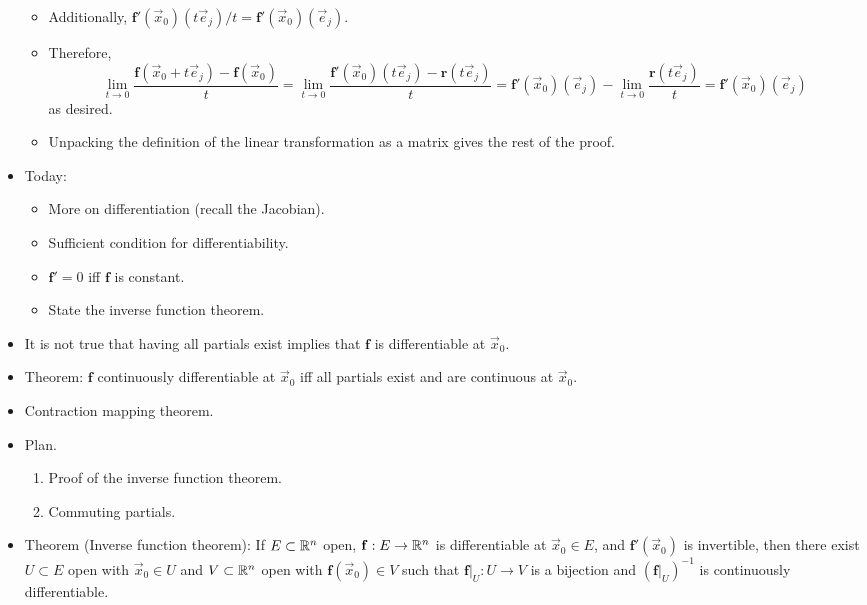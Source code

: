 \documentclass[../notes.tex]{subfiles}
\begin{document}
\begin{itemize}
\begin{itemize}
        \item Additionally, $\mathbf{f}'(\vec{x}_0)(t\vec{e}_j)/t=\mathbf{f}'(\vec{x}_0)(\vec{e}_j)$.
        \item Therefore,
        \begin{equation*}
            \lim_{t\to 0}\frac{\mathbf{f}(\vec{x}_0+t\vec{e}_j)-\mathbf{f}(\vec{x}_0)}{t}
            = \lim_{t\to 0}\frac{\mathbf{f}'(\vec{x}_0)(t\vec{e}_j)-\mathbf{r}(t\vec{e}_j)}{t}
            = \mathbf{f}'(\vec{x}_0)(\vec{e}_j)-\lim_{t\to 0}\frac{\mathbf{r}(t\vec{e}_j)}{t}
            = \mathbf{f}'(\vec{x}_0)(\vec{e}_j)
        \end{equation*}
        as desired.
        \item Unpacking the definition of the linear transformation as a matrix gives the rest of the proof.
    \end{itemize}
    \item Today:
    \begin{itemize}
        \item More on differentiation (recall the Jacobian).
        \item Sufficient condition for differentiability.
        \item $\mathbf{f}'=0$ iff $\mathbf{f}$ is constant.
        \item State the inverse function theorem.
    \end{itemize}
    \item It is not true that having all partials exist implies that $\mathbf{f}$ is differentiable at $\vec{x}_0$.
    \item Theorem: $\mathbf{f}$ continuously differentiable at $\vec{x}_0$ iff all partials exist and are continuous at $\vec{x}_0$.
    \item {}Contraction mapping theorem.
    \item {}Plan.
    \begin{enumerate}
        \item Proof of the inverse function theorem.
        \item Commuting partials.
    \end{enumerate}
    \item Theorem (Inverse function theorem): If $E\subset\mathbb{R}^n$ open, $\mathbf{f}:E\to\mathbb{R}^n$ is differentiable at $\vec{x}_0\in E$, and $\mathbf{f}'(\vec{x}_0)$ is invertible, then there exist $U\subset E$ open with $\vec{x}_0\in U$ and $V\subset\mathbb{R}^n$ open with $\mathbf{f}(\vec{x}_0)\in V$ such that $\mathbf{f}|_U:U\to V$ is a bijection and $(\mathbf{f}|_U)^{-1}$ is continuously differentiable.

\end{itemize}
\end{document}
